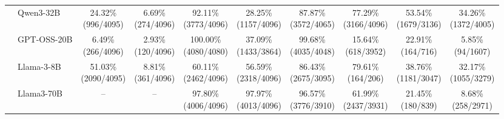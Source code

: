 \begin{table}[t]
{\begin{tabular}{ll*{8}{c}}
 & Qwen3-32B & \makecell[c]{24.32\%\\[-1pt]\scriptsize(996/4095)} & \makecell[c]{6.69\%\\[-1pt]\scriptsize(274/4096)} & \makecell[c]{92.11\%\\[-1pt]\scriptsize(3773/4096)} & \makecell[c]{28.25\%\\[-1pt]\scriptsize(1157/4096)} & \makecell[c]{87.87\%\\[-1pt]\scriptsize(3572/4065)} & \makecell[c]{77.29\%\\[-1pt]\scriptsize(3166/4096)} & \makecell[c]{53.54\%\\[-1pt]\scriptsize(1679/3136)} & \makecell[c]{34.26\%\\[-1pt]\scriptsize(1372/4005)} \\
 & GPT-OSS-20B & \makecell[c]{6.49\%\\[-1pt]\scriptsize(266/4096)} & \makecell[c]{2.93\%\\[-1pt]\scriptsize(120/4096)} & \makecell[c]{100.00\%\\[-1pt]\scriptsize(4080/4080)} & \makecell[c]{37.09\%\\[-1pt]\scriptsize(1433/3864)} & \makecell[c]{99.68\%\\[-1pt]\scriptsize(4035/4048)} & \makecell[c]{15.64\%\\[-1pt]\scriptsize(618/3952)} & \makecell[c]{22.91\%\\[-1pt]\scriptsize(164/716)} & \makecell[c]{5.85\%\\[-1pt]\scriptsize(94/1607)} \\
 & Llama-3-8B & \makecell[c]{51.03\%\\[-1pt]\scriptsize(2090/4095)} & \makecell[c]{8.81\%\\[-1pt]\scriptsize(361/4096)} & \makecell[c]{60.11\%\\[-1pt]\scriptsize(2462/4096)} & \makecell[c]{56.59\%\\[-1pt]\scriptsize(2318/4096)} & \makecell[c]{86.43\%\\[-1pt]\scriptsize(2675/3095)} & \makecell[c]{79.61\%\\[-1pt]\scriptsize(164/206)} & \makecell[c]{38.76\%\\[-1pt]\scriptsize(1181/3047)} & \makecell[c]{32.17\%\\[-1pt]\scriptsize(1055/3279)} \\
 & Llama3-70B & -- & -- & \makecell[c]{97.80\%\\[-1pt]\scriptsize(4006/4096)} & \makecell[c]{97.97\%\\[-1pt]\scriptsize(4013/4096)} & \makecell[c]{96.57\%\\[-1pt]\scriptsize(3776/3910)} & \makecell[c]{61.99\%\\[-1pt]\scriptsize(2437/3931)} & \makecell[c]{21.45\%\\[-1pt]\scriptsize(180/839)} & \makecell[c]{8.68\%\\[-1pt]\scriptsize(258/2971)} \\

\end{tabular}}
\end{table}
